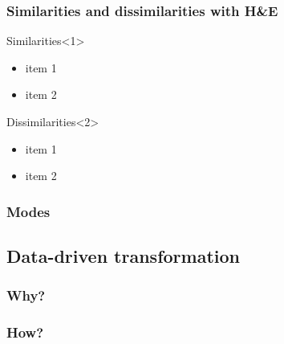 \documentclass{beamer}
\begin{document}
\begin{frame}
\frametitle{Similarities and dissimilarities with H\&E}
    \begin{block}{Similarities}<1>
    {
        \begin{itemize}
        \item item 1
        \item item 2
        \end{itemize}
    }
    \end{block}\pause
    \begin{alertblock}{Dissimilarities}<2>
    {
        \begin{itemize}
        \item item 1
        \item item 2
        \end{itemize}
    }
    \end{alertblock}

\end{frame}

\begin{frame}
\frametitle{Modes}
\end{frame}

\subsection{Data-driven transformation}


\begin{frame}
\frametitle{Why?}

\end{frame}

\begin{frame}

\frametitle{How?}
\end{frame}
\end{document}
